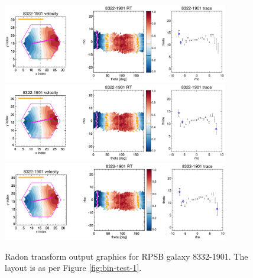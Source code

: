 \documentclass[fleqn,usenatbib]{mnras}
\begin{document}
\begin{figure}
    \centering
    \includegraphics[width=0.88\textwidth]{Images/bin-test/8332-1901-1-1-250-10-HYB10.png}
    \includegraphics[width=0.88\textwidth]{Images/bin-test/8322-1901-1-1-250-10-VOR10.png}
    \includegraphics[width=0.88\textwidth]{Images/bin-test/8322-1901-1-1-250-10-SPX.png}    
    \caption{Radon transform output graphics for RPSB galaxy 8332-1901. The layout is as per Figure \ref{fig:bin-test-1}.}
    \label{fig:bin-test-2}
\end{figure}
\end{document}
